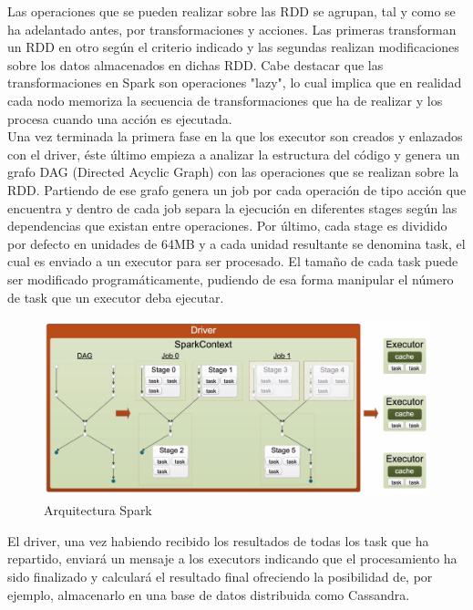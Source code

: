 Las operaciones que se pueden realizar sobre las RDD se agrupan, tal y como se ha adelantado antes, por transformaciones y acciones. Las primeras transforman un RDD en otro según el criterio indicado y las segundas realizan modificaciones sobre los datos almacenados en dichas RDD. Cabe destacar que las transformaciones en Spark son operaciones "lazy", lo cual implica que en realidad cada nodo memoriza la secuencia de transformaciones que ha de realizar y los procesa cuando una acción es ejecutada.\\

Una vez terminada la primera fase en la que los executor son creados y enlazados con el driver, éste último empieza a analizar la estructura del código y genera un grafo DAG (Directed Acyclic Graph) con las operaciones que se realizan sobre la RDD. Partiendo de ese grafo genera un job por cada operación de tipo acción que encuentra y dentro de cada job separa la ejecución en diferentes stages según las dependencias que existan entre operaciones. Por último, cada stage es dividido por defecto en unidades de 64MB y a cada unidad resultante se denomina task, el cual es enviado a un executor para ser procesado. El tamaño de cada task puede ser modificado programáticamente, pudiendo de esa forma manipular el número de task que un executor deba ejecutar.\\

\begin{figure}[h]
	\centering
	\includegraphics[width=1\textwidth]{Ilustraciones/spark_task_creation.png}
	\caption{Arquitectura Spark}
	\label{fig:spark_task_creation}
\end{figure}

El driver, una vez habiendo recibido los resultados de todas los task que ha repartido, enviará un mensaje a los executors indicando que el procesamiento ha sido finalizado y calculará el resultado final ofreciendo la posibilidad de, por ejemplo, almacenarlo en una base de datos distribuida como Cassandra.\\







